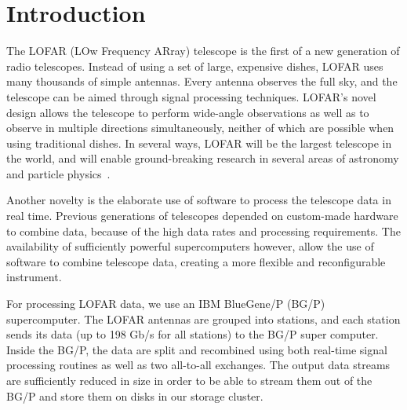 \documentclass{llncs}
\begin{document}
\section{Introduction}



The LOFAR (LOw Frequency ARray) telescope is the first of a new generation of radio telescopes. Instead of using a set of large, expensive dishes, LOFAR uses many thousands of simple antennas. Every antenna observes the full sky, and the telescope can be aimed through signal processing techniques. LOFAR's novel design allows the telescope to perform wide-angle observations as well as to observe in multiple directions simultaneously, neither of which are possible when using traditional dishes. In several ways, LOFAR will be the largest telescope in the world, and will enable ground-breaking research in several areas of astronomy and particle physics~\cite{Bruyn:02}.

Another novelty is the elaborate use of software to process the telescope data in real time. Previous generations of telescopes depended on custom-made hardware to combine data, because of the high data rates and processing requirements. The availability of sufficiently powerful supercomputers however, allow the use of software to combine telescope data, creating a more flexible and reconfigurable instrument.

For processing LOFAR data, we use an IBM BlueGene/P (BG/P) supercomputer. The LOFAR antennas are grouped into stations, and each station sends its data (up to 198 Gb/s for all stations) to the BG/P super computer. Inside the BG/P, the data are split and recombined using both real-time signal processing routines as well as two all-to-all exchanges. The output data streams are sufficiently reduced in size in order to be able to stream them out of the BG/P and store them on disks in our storage cluster.
\end{document}
